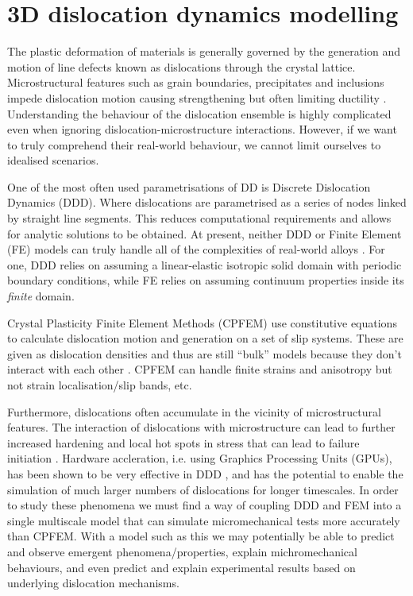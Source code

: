 \section{3D dislocation dynamics modelling}
\label{s:3d_ddd}
The plastic deformation of materials is generally governed by the generation and motion of line defects known as dislocations through the crystal lattice. Microstructural features such as grain boundaries, precipitates and inclusions impede dislocation motion causing strengthening but often limiting ductility \cite{init_fail_dln}. Understanding the behaviour of the dislocation ensemble is highly complicated even when ignoring dislocation-microstructure interactions. However, if we want to truly comprehend their real-world behaviour, we cannot limit ourselves to idealised scenarios.

One of the most often used parametrisations of DD is Discrete Dislocation Dynamics (DDD). Where dislocations are parametrised as a series of nodes linked by straight line segments. This reduces computational requirements and allows for analytic solutions to be obtained. At present, neither DDD or Finite Element (FE) models can truly handle all of the complexities of real-world alloys \cite{ddd_fem1, paradis, fem_ddd2, fem_ddd}. For one, DDD relies on assuming a linear-elastic isotropic solid domain with periodic boundary conditions, while FE relies on assuming continuum properties inside its \emph{finite} domain.

Crystal Plasticity Finite Element Methods (CPFEM) use constitutive equations to calculate dislocation motion and generation on a set of slip systems. These are given as dislocation densities and thus are still ``bulk'' models because they don't interact with each other \cite{cpfem1}. CPFEM can handle finite strains and anisotropy but not strain localisation/slip bands, etc.

Furthermore, dislocations often accumulate in the vicinity of microstructural features. The interaction of dislocations with microstructure can lead to further increased hardening and local hot spots in stress that can lead to failure initiation \cite{size_effects, dln_ind_hard}. Hardware accleration, i.e. using Graphics Processing Units (GPUs), has been shown to be very effective in DDD \cite{gpu_ddd}, and has the potential to enable the simulation of much larger numbers of dislocations for longer timescales. In order to study these phenomena we must find a way of coupling DDD and FEM into a single multiscale model that can simulate micromechanical tests more accurately than CPFEM. With a model such as this we may potentially be able to predict and observe emergent phenomena/properties, explain michromechanical behaviours, and even predict and explain experimental results based on underlying dislocation mechanisms.

